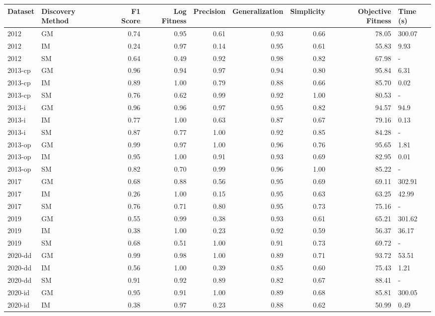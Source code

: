 \begin{tabular}{llrrrrrrl}
\toprule
Dataset & Discovery Method & F1 Score & Log Fitness & Precision & Generalization & Simplicity & Objective Fitness & Time (s) \\
\midrule
2012 & GM & 0.74 & 0.95 & 0.61 & 0.93 & 0.66 & 78.05 & 300.07 \\
2012 & IM & 0.24 & 0.97 & 0.14 & 0.95 & 0.61 & 55.83 & 9.93 \\
2012 & SM & 0.64 & 0.49 & 0.92 & 0.98 & 0.82 & 67.98 & - \\
2013-cp & GM & 0.96 & 0.94 & 0.97 & 0.94 & 0.80 & 95.84 & 6.31 \\
2013-cp & IM & 0.89 & 1.00 & 0.79 & 0.88 & 0.66 & 85.70 & 0.02 \\
2013-cp & SM & 0.76 & 0.62 & 0.99 & 0.92 & 1.00 & 80.53 & - \\
2013-i & GM & 0.96 & 0.96 & 0.97 & 0.95 & 0.82 & 94.57 & 94.9 \\
2013-i & IM & 0.77 & 1.00 & 0.63 & 0.87 & 0.67 & 79.16 & 0.13 \\
2013-i & SM & 0.87 & 0.77 & 1.00 & 0.92 & 0.85 & 84.28 & - \\
2013-op & GM & 0.99 & 0.97 & 1.00 & 0.96 & 0.76 & 95.65 & 1.81 \\
2013-op & IM & 0.95 & 1.00 & 0.91 & 0.93 & 0.69 & 82.95 & 0.01 \\
2013-op & SM & 0.82 & 0.70 & 0.99 & 0.96 & 1.00 & 85.22 & - \\
2017 & GM & 0.68 & 0.88 & 0.56 & 0.95 & 0.69 & 69.11 & 302.91 \\
2017 & IM & 0.26 & 1.00 & 0.15 & 0.95 & 0.63 & 63.25 & 42.99 \\
2017 & SM & 0.76 & 0.71 & 0.80 & 0.95 & 0.73 & 75.16 & - \\
2019 & GM & 0.55 & 0.99 & 0.38 & 0.93 & 0.61 & 65.21 & 301.62 \\
2019 & IM & 0.38 & 1.00 & 0.23 & 0.92 & 0.59 & 56.37 & 36.17 \\
2019 & SM & 0.68 & 0.51 & 1.00 & 0.91 & 0.73 & 69.72 & - \\
2020-dd & GM & 0.99 & 0.98 & 1.00 & 0.89 & 0.71 & 93.72 & 53.51 \\
2020-dd & IM & 0.56 & 1.00 & 0.39 & 0.85 & 0.60 & 75.43 & 1.21 \\
2020-dd & SM & 0.91 & 0.92 & 0.89 & 0.82 & 0.67 & 88.41 & - \\
2020-id & GM & 0.95 & 0.91 & 1.00 & 0.89 & 0.68 & 85.81 & 300.05 \\
2020-id & IM & 0.38 & 0.97 & 0.23 & 0.88 & 0.62 & 50.99 & 0.49 \\

\end{tabular}
